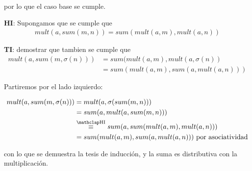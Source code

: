 \begin{enumerate}[a)]
    por lo que el caso base se cumple.
    
    \newpage
    
    \textbf{HI}: Supongamos que se cumple que 
    \begin{align*}
        mult(a, sum(m, n)) = sum(mult(a, m), mult(a, n))
    \end{align*}
    
    \textbf{TI}: demostrar que tambien se cumple que
    \begin{align*}
        mult(a, sum(m, \sigma(n))) &= sum(mult(a, m), mult(a, \sigma(n)) \\
                                   &= sum(mult(a, m), sum(a, mult(a, n)))
    \end{align*}
    
    Partiremos por el lado izquierdo:
    
    \begin{align*}
        mult(a, sum(m, \sigma(n))) &= mult(a, \sigma(sum(m, n))) \\
                                   &= sum(a, mult(a, sum(m, n))) \\
                                   &\myeq sum(a, sum(mult(a, m), mult(a, n))) \\
                                   &= sum(mult(a, m), sum(a, mult(a, n))) \text{ por asociatividad} \\
    \end{align*}
    
    con lo que se demuestra la tesis de inducción, y la suma es distributiva con la multiplicación.
\end{enumerate}